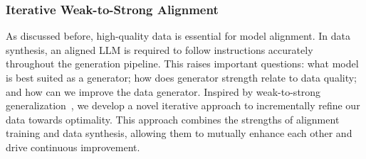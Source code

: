 \documentclass[11pt]{article}
\begin{document}



\subsubsection{Iterative Weak-to-Strong Alignment}
As discussed before, high-quality data is essential for model alignment. In data synthesis, an aligned LLM is required to follow instructions accurately throughout the generation pipeline. This raises important questions: what model is best suited as a generator; how does generator strength relate to data quality; and how can we improve the data generator. Inspired by weak-to-strong generalization~\citep{burns2023weak}, we develop a novel iterative approach to incrementally refine our data towards optimality. This approach combines the strengths of alignment training and data synthesis, allowing them to mutually enhance each other and drive continuous improvement.
\end{document}
